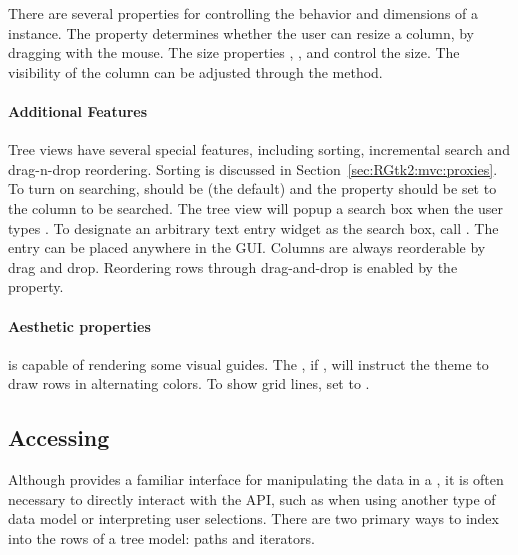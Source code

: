There are several properties for controlling the behavior and
dimensions of a  instance. The property
 determines whether the user can resize a column, by
dragging with the mouse. The size properties ,
, and  control the size. The
visibility of the column can be adjusted through the
 method.

\paragraph{Additional Features}

Tree views have several special features, including sorting,
incremental search and drag-n-drop reordering. Sorting is discussed in
Section~\ref{sec:RGtk2:mvc:proxies}. To turn on searching,
 should be  (the default) and the
 property should be set to the column to be
searched. The tree view will popup a search box when the user types
. To designate an arbitrary text entry widget as the
search box, call . The entry can
be placed anywhere in the GUI. Columns are always reorderable by drag
and drop. Reordering rows through drag-and-drop is enabled by the
 property.

\paragraph{Aesthetic properties}

 is capable of rendering some visual guides. The
, if , will instruct the theme to draw
rows in alternating colors. To show grid lines, set
 to .

\subsection{Accessing }
\label{sec:RGtk2:mvc:iterators}

Although  provides a familiar interface for
manipulating the data in a , it is often necessary
to directly interact with the \GTK\/ API, such as when using another
type of data model or interpreting user selections. There are two
primary ways to index into the rows of a tree model: paths and
iterators.


